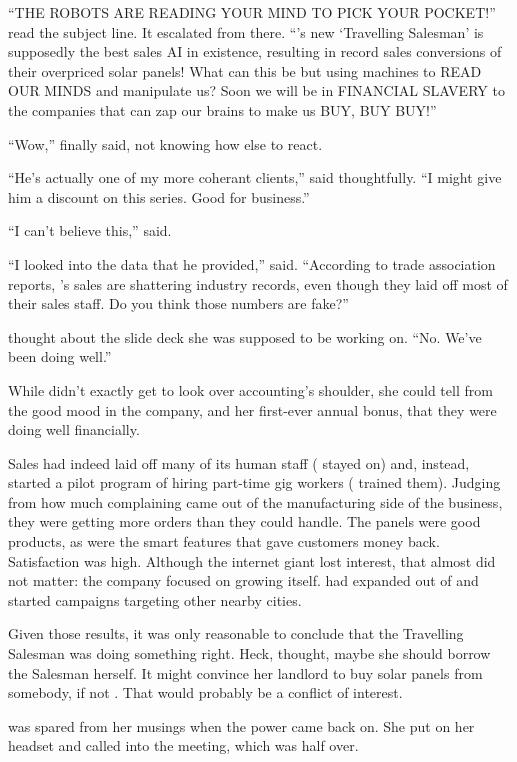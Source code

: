 ``THE ROBOTS ARE READING YOUR MIND TO PICK YOUR POCKET!'' read the subject line. It escalated from there. ``\energyCompany{}'s new `Travelling Salesman' is supposedly the best sales AI in existence, resulting in record sales conversions of their overpriced solar panels! What can this be but using machines to READ OUR MINDS and manipulate us? Soon we will be in FINANCIAL SLAVERY to the companies that can zap our brains to make us BUY, BUY BUY!''

``Wow,'' {\protag} finally said, not knowing how else to react.

``He's actually one of my more coherant clients,'' {\sidetag} said thoughtfully. ``I might give him a discount on this series. Good for business.''

``I can't believe this,'' {\protag} said.

``I looked into the data that he provided,'' {\sidetag} said. ``According to trade association reports, \energyCompany{}'s sales are shattering industry records, even though they laid off most of their sales staff. Do you think those numbers are fake?''

{\protag} thought about the slide deck she was supposed to be working on. ``No. We’ve been doing well.''

While {\protag} didn’t exactly get to look over accounting's shoulder, she could tell from the good mood in the company, and her first-ever annual bonus, that they were doing well financially.

Sales had indeed laid off many of its human staff (\energyJerk{} stayed on) and, instead, started a pilot program of hiring part-time gig workers (\energyJerk{} trained them). Judging from how much complaining came out of the manufacturing side of the business, they were getting more orders than they could handle. The panels were good products, as were the smart features that gave customers money back. Satisfaction was high. Although the internet giant lost interest, that almost did not matter: the company focused on growing itself. \energyCompany{} had expanded out of \crunchyCity{} and started campaigns targeting other nearby cities.

Given those results, it was only reasonable to conclude that the Travelling Salesman was doing something right. Heck, {\protag} thought, maybe she should borrow the Salesman herself. It might convince her landlord to buy solar panels from somebody, if not \energyCompany{}. That would probably be a conflict of interest.

{\protag} was spared from her musings when the power came back on. She put on her headset and called into the meeting, which was half over.

